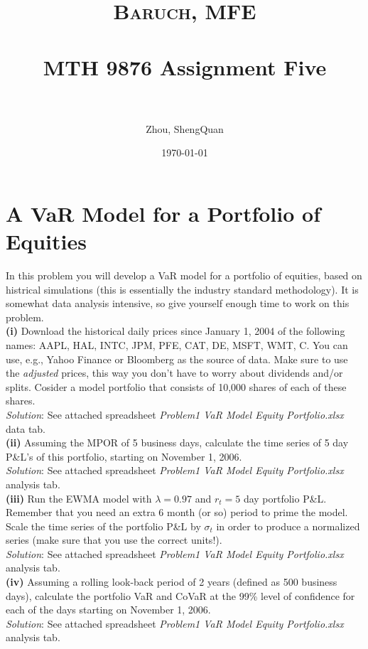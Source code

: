 \documentclass[paper=a4, fontsize=11pt]{scrartcl} %
\title{	
\normalfont \normalsize 
\textsc{Baruch, MFE} \\ [25pt] %
\horrule{0.5pt} \\[0.4cm] %
\huge MTH 9876 Assignment Five\\  %
\horrule{2pt} \\[0.5cm] %
}
\author{Zhou, ShengQuan} %
\date{\normalsize\today} %
\numberwithin{equation}{section} %
\numberwithin{figure}{section} %
\numberwithin{table}{section} %
\begin{document}
	


\maketitle %

\newpage

\section{A VaR Model for a Portfolio of Equities}
In this problem you will develop a VaR model for a portfolio of equities, based on histrical simulations 
(this is essentially the industry standard methodology). It is somewhat data analysis intensive, 
so give yourself enough time to work on this problem.\\

\textbf{(i)} Download the historical daily prices since January 1, 2004 of the following names: 
AAPL, HAL, INTC, JPM, PFE, CAT, DE, MSFT, WMT, C. You can use, e.g., Yahoo Finance or Bloomberg as the source
of data. Make sure to use the \textit{adjusted} prices, this way you don't have to worry about dividends and/or splits. 
Cosider a model portfolio that consists of 10,000 shares of each of these shares.\\
\textit{Solution}: See attached spreadsheet \textit{Problem1 VaR Model Equity Portfolio.xlsx} data tab.\\

\textbf{(ii)} Assuming the MPOR of 5 business days, calculate the time series of 5
day P\&L's of this portfolio, starting on November 1, 2006.\\
\textit{Solution}: See attached spreadsheet \textit{Problem1 VaR Model Equity Portfolio.xlsx} analysis tab.\\

\textbf{(iii)} Run the EWMA model with $\lambda=0.97$ and $r_t=5$ day portfolio P\&L.
Remember that you need an extra 6 month (or so) period to prime the model. 
Scale the time series of the portfolio P\&L by $\sigma_t$ in order to produce a normalized series
(make sure that you use the correct units!).\\
\textit{Solution}: See attached spreadsheet \textit{Problem1 VaR Model Equity Portfolio.xlsx} analysis tab.\\

\textbf{(iv)} Assuming a rolling look-back period of 2 years (defined as 500 business days), 
calculate the portfolio VaR and CoVaR at the 99\% level of confidence for each of the days starting
 on November 1, 2006.\\
 \textit{Solution}: See attached spreadsheet \textit{Problem1 VaR Model Equity Portfolio.xlsx} analysis tab.\\
  
\end{document}
